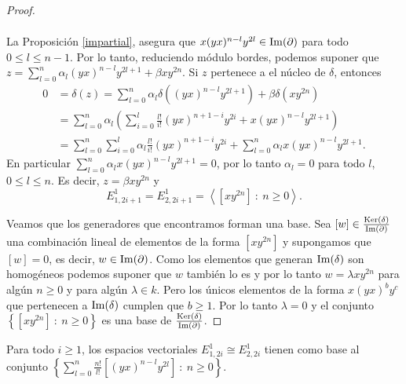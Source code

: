 \documentclass[fleqn,../tesis.tex]{subfiles}
\begin{document}
\begin{proof}
\begin{itemize}
\begin{align*}
		\end{align*}
		La Proposición \ref{impartial}, asegura que $x(yx)^{n - l}y^{2l} \in \operatorname{Im}(\partial)$ para todo $0 \leq l \leq n - 1$.
		Por lo tanto, reduciendo módulo bordes, podemos suponer que $z = \sum_{l = 0}^n\alpha_l(yx)^{n - l}y^{2l + 1} + \beta xy^{2n}$.
		Si $z$ pertenece a el núcleo de $\delta$, entonces
		\begin{align*}
			0 &= \delta(z) = \sum_{l = 0}^n\alpha_l\delta((yx)^{n - l}y^{2l + 1}) + \beta \delta(xy^{2n}) \\
			&= \sum_{l = 0}^n\alpha_l \left( \sum_{i = 0}^l\frac{l!}{i!}(yx)^{n + 1 - i}y^{2i} + x(yx)^{n - l}y^{2l + 1} \right) \\
			&= \sum_{l = 0}^n \sum_{i = 0}^l\alpha_l\frac{l!}{i!}(yx)^{n + 1 - i}y^{2i}
				+ \sum_{l = 0}^n\alpha_l x(yx)^{n - l}y^{2l + 1}.
		\end{align*}	
		En particular $\sum_{l = 0}^n\alpha_l x(yx)^{n - l}y^{2l + 1}  = 0$, por lo tanto $\alpha_l = 0$ para todo $l$, $0 \leq l \leq n$.
		Es decir, $z = \beta xy^{2n}$ y
		\[
			E_{1,2i + 1}^1 = E_{2, 2i + 1}^1 = \left\langle \left[xy^{2n}\right]\ :\ n \geq 0 \right\rangle.
		\]
	\end{itemize}
		Veamos que los generadores que encontramos forman una base. Sea $[w] \in \frac{\operatorname{Ker}(\delta)}{\operatorname{Im}(\partial)}$ una combinación
		lineal de elementos de la forma $[xy^{2n}]$ y supongamos que $[w] = 0$, es decir, $w \in \operatorname{Im}(\partial)$.
		Como los elementos que generan $\operatorname{Im}(\delta)$ son homogéneos podemos suponer que $w$ también lo es y por lo tanto $w = \lambda xy^{2n}$
		para algún $n \geq 0$ y para algún $\lambda \in k$.
		Pero los únicos elementos de la forma $x(yx)^by^c$ que pertenecen a $\operatorname{Im}(\delta)$ cumplen que $b \geq 1$.
		Por lo tanto $\lambda = 0$ y el conjunto $\left\{ [xy^{2n}] \ :\ n \geq 0\right\}$ es una base de $\frac{\operatorname{Ker}(\delta)}{\operatorname{Im}(\partial)}$.	 
\end{proof}
\begin{prop}
	Para todo $i \geq 1$, los espacios vectoriales $E_{1,2i}^1 \cong E_{2, 2i}^1$
	tienen como base al conjunto $\left\{ \sum_{l = 0}^n \frac{n!}{l!}\left[(yx)^{n - l}y^{2l}\right] \ :\ n \geq 0\right\}$.
\end{prop}
\end{document}
